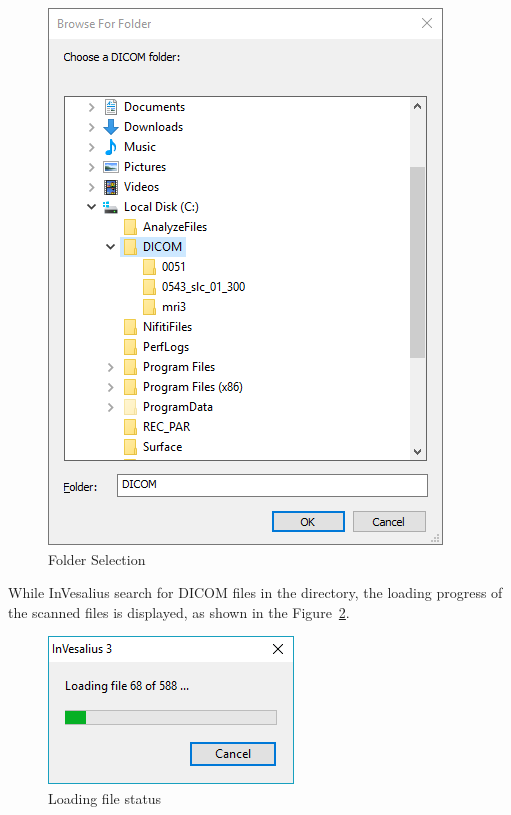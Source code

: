 \begin{figure}[!htb]
\centering
\includegraphics[scale=0.5]{../user_guide_figures/invesalius_screen/import_select_folder_en.png}
\caption{Folder Selection}
\label{fig:win_folder}
\end{figure}

\hspace{.2cm}

While InVesalius search for DICOM files in the directory, the loading progress of the scanned files is displayed, as shown in the Figure~\ref{fig:ver_file}.

\begin{figure}[!htb]
\centering
\includegraphics[scale=0.6]{../user_guide_figures/invesalius_screen/import_load_files_en.png}
\caption{Loading file status}
\label{fig:ver_file}
\end{figure}

